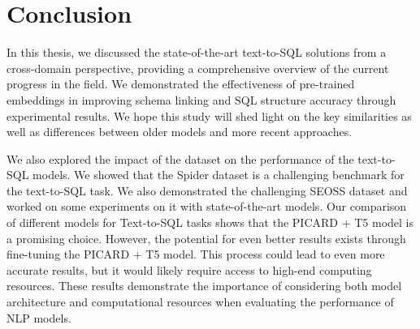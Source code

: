 \section{Conclusion}




% 
% 
% 


In this thesis, we discussed the state-of-the-art text-to-SQL solutions from a cross-domain perspective, providing a comprehensive overview of the current progress in the field. We demonstrated the effectiveness of pre-trained embeddings in improving schema linking and SQL structure accuracy through experimental results. We hope this study will shed light on the key similarities as well as differences between older models and more recent approaches.

We also explored the impact of the dataset on the performance of the text-to-SQL models. We showed that the Spider dataset is a challenging benchmark for the text-to-SQL task. We also demonstrated the challenging SEOSS dataset and worked on some experiments on it with state-of-the-art models. Our comparison of different models for Text-to-SQL tasks shows that the PICARD + T5 model is a promising choice. However, the potential for even better results exists through fine-tuning the PICARD + T5 model. This process could lead to even more accurate results, but it would likely require access to high-end computing resources. These results demonstrate the importance of considering both model architecture and computational resources when evaluating the performance of NLP models.

